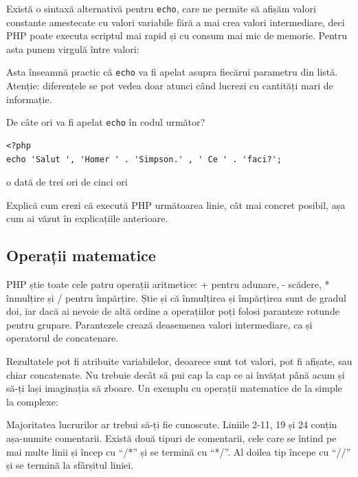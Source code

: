 Există o sintaxă alternativă pentru \texttt{echo}, care ne permite
să afișăm valori constante amestecate cu valori variabile fără
a mai crea valori intermediare, deci PHP poate executa
scriptul mai rapid și cu consum mai mic de memorie.
Pentru asta punem virgulă între valori:


Asta înseamnă practic că \texttt{echo} va fi apelat asupra fiecărui
parametru din listă. Atenție: diferențele se pot vedea
doar atunci când lucrezi cu cantități mari de informație.

\begin{Exercise}[difficulty=1,title={Sintaxa alternativă pentru echo}]
De câte ori va fi apelat \texttt{echo} în codul următor? %
\begin{lstlisting}
<?php
echo 'Salut ', 'Homer ' . 'Simpson.' , ' Ce ' . 'faci?';
\end{lstlisting}
\Question o dată
\Question de trei ori
\Question de cinci ori
\end{Exercise}

\begin{Exercise}[difficulty=2,title={Determinarea fluxului de execuție într-un exemplu simplu}]
Explică cum crezi că execută PHP următoarea linie, cât mai concret posibil, așa cum
ai văzut în explicațiile anterioare.

\end{Exercise}

\subsection{Operații matematice}

PHP știe toate cele patru operații aritmetice: + pentru adunare,
- scădere, * înmulțire și / pentru împărțire. Știe și că
înmulțirea și împărțirea sunt de gradul doi, iar dacă ai nevoie
de altă ordine a operațiilor poți folosi paranteze rotunde pentru
grupare. Parantezele crează deasemenea valori intermediare, ca
și operatorul de concatenare.

Rezultatele pot fi atribuite variabilelor, deoarece sunt tot
valori, pot fi afișate, sau chiar concatenate. Nu trebuie decât
să pui cap la cap ce ai învățat până acum și să-ți lași imaginația
să zboare.
Un exemplu cu operații matematice de la simple la complexe:


Majoritatea lucrurilor ar trebui să-ți fie cunoscute. Liniile
2-11, 19 și 24 conțin așa-numite comentarii. Există două
tipuri de comentarii, cele care se întind pe mai multe linii
și încep cu ``/*'' și se termină cu ``*/''. Al doilea tip
începe cu ``//'' și se termină la sfârșitul liniei.


